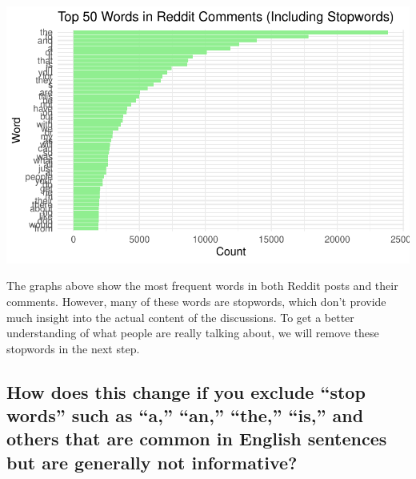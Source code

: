 \documentclass[
  letterpaper,
  DIV=11,
  numbers=noendperiod]{scrartcl}
\begin{document}
\includegraphics{Reddit_eda_files/figure-pdf/unnamed-chunk-7-2.pdf}

The graphs above show the most frequent words in both Reddit posts and
their comments. However, many of these words are stopwords, which don't
provide much insight into the actual content of the discussions. To get
a better understanding of what people are really talking about, we will
remove these stopwords in the next step.

\subsection{How does this change if you exclude ``stop words'' such as
``a,'' ``an,'' ``the,'' ``is,'' and others that are common in English
sentences but are generally not
informative?}\label{how-does-this-change-if-you-exclude-stop-words-such-as-a-an-the-is-and-others-that-are-common-in-english-sentences-but-are-generally-not-informative}
\end{document}
